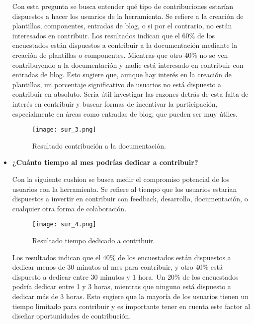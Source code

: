 \begin{itemize}
    Con esta pregunta se busca entender qué tipo de contribuciones estarían dispuestos
    a hacer los usuarios de la herramienta. Se refiere a la creación de plantillas,
    componentes, entradas de blog, o si por el contrario, no están interesados en contribuir.
    Los resultados indican que el 60\% de los encuestados están dispuestos a contribuir 
    a la documentación mediante la creación de plantillas o componentes. 
    Mientras que otro 40\% no se ven contribuyendo a la documentación y nadie está interesado 
    en contribuir con entradas de blog. Esto sugiere que, aunque hay interés en la creación 
    de plantillas, un porcentaje significativo de usuarios no está dispuesto a contribuir 
    en absoluto. Sería útil investigar las razones detrás de esta falta de interés en 
    contribuir y buscar formas de incentivar la participación, especialmente en áreas como 
    entradas de blog, que pueden ser muy útiles.
    
    \begin{figure}[!h]
        \centering
        \texttt{[image: sur\_3.png]}
        \caption{Resultado contribución a la documentación.}
        \label{fig:sur_3}
    \end{figure}


    \item \textbf{¿Cuánto tiempo al mes podrías dedicar a contribuir?}

    Con la siguiente cushion se busca medir el compromiso potencial de los usuarios con la 
    herramienta. Se refiere al tiempo que los usuarios estarían dispuestos a invertir 
    en contribuir con feedback, desarrollo, documentación, o cualquier otra 
    forma de colaboración.

    \begin{figure}[!h]
        \centering
        \texttt{[image: sur\_4.png]}
        \caption{Resultado tiempo dedicado a contribuir.}
        \label{fig:sur_4}
    \end{figure}

    Los resultados indican que el 40\% de los encuestados están dispuestos a dedicar menos 
    de 30 minutos al mes para contribuir, y otro 40\% está dispuesto a dedicar entre 30 
    minutos y 1 hora. Un 20\% de los encuestados podría dedicar entre 1 y 3 horas, 
    mientras que ninguno está dispuesto a dedicar más de 3 horas. Esto sugiere que la 
    mayoría de los usuarios tienen un tiempo limitado para contribuir y es importante 
    tener en cuenta este factor al diseñar oportunidades de contribución.
    

\end{itemize}
